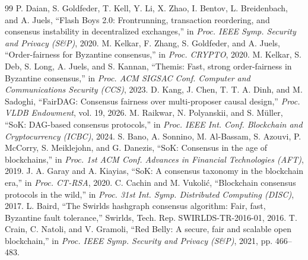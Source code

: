\documentclass[UTF8,fontset=windows,a4paper,11pt]{ctexart}
\begin{document}
\begin{thebibliography}{99}
 P. Daian, S. Goldfeder, T. Kell, Y. Li, X. Zhao, I. Bentov, L. Breidenbach, and A. Juels, “Flash Boys 2.0: Frontrunning, transaction reordering, and consensus instability in decentralized exchanges,” in \textit{Proc. IEEE Symp. Security and Privacy (S\&P)}, 2020.
 M. Kelkar, F. Zhang, S. Goldfeder, and A. Juels, “Order-fairness for Byzantine consensus,” in \textit{Proc. CRYPTO}, 2020.
 M. Kelkar, S. Deb, S. Long, A. Juels, and S. Kannan, “Themis: Fast, strong order-fairness in Byzantine consensus,” in \textit{Proc. ACM SIGSAC Conf. Computer and Communications Security (CCS)}, 2023.
 D. Kang, J. Chen, T. T. A. Dinh, and M. Sadoghi, “FairDAG: Consensus fairness over multi-proposer causal design,” \textit{Proc. VLDB Endowment}, vol. 19, 2026.
 M. Raikwar, N. Polyanskii, and S. Müller, “SoK: DAG-based consensus protocols,” in \textit{Proc. IEEE Int. Conf. Blockchain and Cryptocurrency (ICBC)}, 2024.
 S. Bano, A. Sonnino, M. Al-Bassam, S. Azouvi, P. McCorry, S. Meiklejohn, and G. Danezis, “SoK: Consensus in the age of blockchains,” in \textit{Proc. 1st ACM Conf. Advances in Financial Technologies (AFT)}, 2019.
 J. A. Garay and A. Kiayias, “SoK: A consensus taxonomy in the blockchain era,” in \textit{Proc. CT-RSA}, 2020.
 C. Cachin and M. Vukolić, “Blockchain consensus protocols in the wild,” in \textit{Proc. 31st Int. Symp. Distributed Computing (DISC)}, 2017.
 L. Baird, “The Swirlds hashgraph consensus algorithm: Fair, fast, Byzantine fault tolerance,” Swirlds, Tech. Rep. SWIRLDS-TR-2016-01, 2016.
 T. Crain, C. Natoli, and V. Gramoli, “Red Belly: A secure, fair and scalable open blockchain,” in \textit{Proc. IEEE Symp. Security and Privacy (S\&P)}, 2021, pp. 466–483.
\end{thebibliography}
\end{document}
